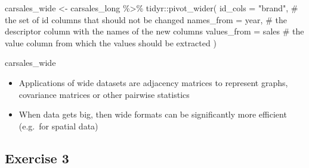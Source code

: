 \documentclass[
  letterpaper,
]{book}
\newenvironment{Shaded}{}{}
\newcommand{\AttributeTok}[1]{\textcolor[rgb]{0.84,0.23,0.29}{#1}}
\newcommand{\CommentTok}[1]{\textcolor[rgb]{0.42,0.45,0.49}{#1}}
\newcommand{\FunctionTok}[1]{\textcolor[rgb]{0.44,0.26,0.76}{#1}}
\newcommand{\NormalTok}[1]{\textcolor[rgb]{0.14,0.16,0.18}{#1}}
\newcommand{\OtherTok}[1]{\textcolor[rgb]{0.44,0.26,0.76}{#1}}
\newcommand{\SpecialCharTok}[1]{\textcolor[rgb]{0.00,0.36,0.77}{#1}}
\newcommand{\StringTok}[1]{\textcolor[rgb]{0.01,0.18,0.38}{#1}}
\providecommand{\tightlist}{%
  \setlength{\itemsep}{0pt}\setlength{\parskip}{0pt}}\usepackage{longtable,booktabs,array}
\begin{document}
\begin{Shaded}
\begin{Highlighting}[]
\NormalTok{carsales\_wide }\OtherTok{\textless{}{-}}\NormalTok{ carsales\_long }\SpecialCharTok{\%\textgreater{}\%}\NormalTok{ tidyr}\SpecialCharTok{::}\FunctionTok{pivot\_wider}\NormalTok{(}
  \AttributeTok{id\_cols =} \StringTok{"brand"}\NormalTok{,  }\CommentTok{\# the set of id columns that should not be changed}
  \AttributeTok{names\_from =}\NormalTok{ year,  }\CommentTok{\# the descriptor column with the names of the new columns}
  \AttributeTok{values\_from =}\NormalTok{ sales }\CommentTok{\# the value column from which the values should be extracted}
\NormalTok{)}

\NormalTok{carsales\_wide}
\end{Highlighting}
\end{Shaded}

\begin{itemize}
\tightlist
\item
  Applications of wide datasets are adjacency matrices to represent
  graphs, covariance matrices or other pairwise statistics
\item
  When data gets big, then wide formats can be significantly more
  efficient (e.g.~for spatial data)
\end{itemize}

\hypertarget{exercise-3}{%
\subsection{Exercise 3}\label{exercise-3}}
\end{document}
